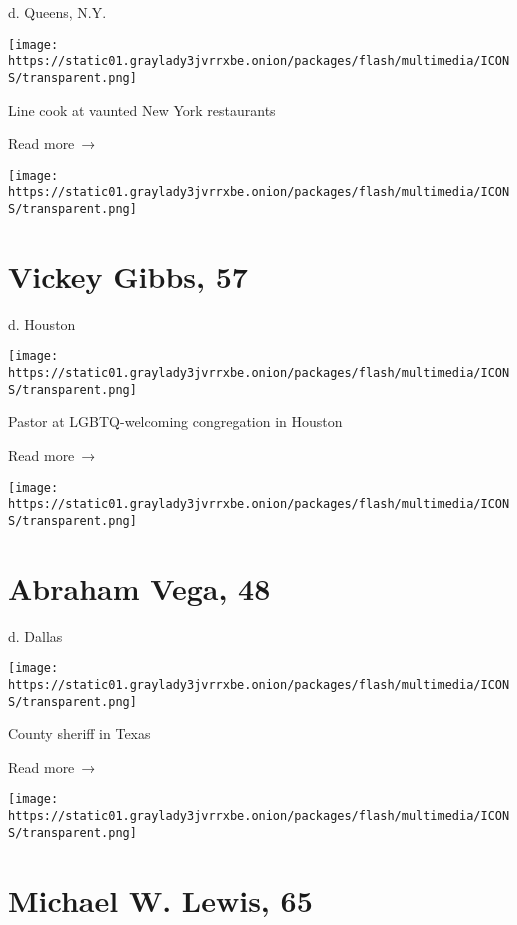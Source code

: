 d. Queens, N.Y.

\texttt{[image: https://static01.graylady3jvrrxbe.onion/packages/flash/multimedia/ICONS/transparent.png]}

Line cook at vaunted New York restaurants

 Read more~→

\href{https://www.nytimes3xbfgragh.onion/2020/07/15/us/vickey-gibbs-dead-coronavirus.html}{}

\texttt{[image: https://static01.graylady3jvrrxbe.onion/packages/flash/multimedia/ICONS/transparent.png]}

\hypertarget{vickey-gibbs-57}{%
\section{Vickey Gibbs, 57}\label{vickey-gibbs-57}}

d. Houston

\texttt{[image: https://static01.graylady3jvrrxbe.onion/packages/flash/multimedia/ICONS/transparent.png]}

Pastor at LGBTQ-welcoming congregation in Houston

 Read more~→

\href{https://www.nytimes3xbfgragh.onion/2020/07/14/us/abraham-vega-dead-coronavirus.html}{}

\texttt{[image: https://static01.graylady3jvrrxbe.onion/packages/flash/multimedia/ICONS/transparent.png]}

\hypertarget{abraham-vega-48}{%
\section{Abraham Vega, 48}\label{abraham-vega-48}}

d. Dallas

\texttt{[image: https://static01.graylady3jvrrxbe.onion/packages/flash/multimedia/ICONS/transparent.png]}

County sheriff in Texas

 Read more~→

\href{https://www.nytimes3xbfgragh.onion/2020/07/13/obituaries/michael-lewis-dead-coronavirus.html}{}

\texttt{[image: https://static01.graylady3jvrrxbe.onion/packages/flash/multimedia/ICONS/transparent.png]}

\hypertarget{michael-w-lewis-65}{%
\section{Michael W. Lewis, 65}\label{michael-w-lewis-65}}

